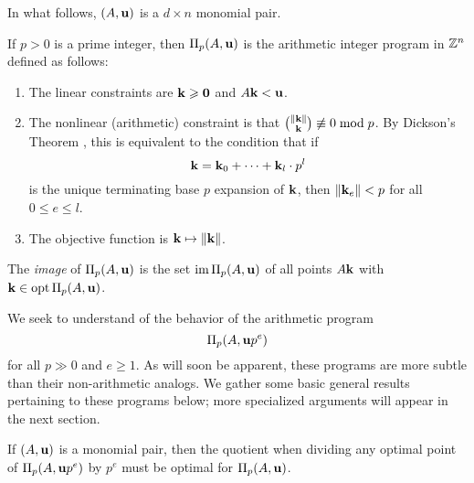 \documentclass[11pt]{amsart}
\begin{document}
In what follows, $(A, \mathbf{u})$ is a $d \times n$ monomial pair.


\begin{definition} If $p>0$ is a prime integer, then $\Pi_p(A, \mathbf{u})$ is the arithmetic integer program in $\mathbb{Z}^n$ defined as follows:
\begin{enumerate}
\item The linear constraints are $\mathbf{k} \geqslant \mathbf{0}$ and $A \mathbf{k} < \mathbf{u}$.  
\item The nonlinear (arithmetic) constraint is that $\binom{\| \mathbf{k} \|}{\mathbf{k}} \not \equiv 0 \bmod p$.
By Dickson's Theorem \cite{dickson.multinomial}, this is equivalent to the condition that  if \[ \mathbf{k} = \mathbf{k}_0 + \cdots + \mathbf{k}_l \cdot  p^l\] is the unique terminating base $p$ expansion of $\mathbf{k}$, then $\| \mathbf{k}_e \| < p$ for all $0 \leq e \leq l $.
\item The objective function is $\mathbf{k} \mapsto \| \mathbf{k} \|$.
\end{enumerate}

\end{definition}



\begin{definition}
The \emph{image} of $\Pi_p(A, \mathbf{u})$ is the set $\operatorname{im} \Pi_p(A, \mathbf{u})$ of all points  $A \mathbf{k}$ with $\mathbf{k} \in \operatorname{opt} \Pi_p(A, \mathbf{u})$. 
\end{definition}

We seek to understand of the behavior of the arithmetic program \[ \Pi_p(A, \mathbf{u}p^e)\] for all $p \gg 0$ and $e \geq 1$.    As will soon be apparent, these programs are more subtle than their non-arithmetic analogs.  We gather some basic general results pertaining to these programs below;  more specialized arguments will appear in the next section.

\begin{lemma} 
\label{optimal division: L}  If $(A, \mathbf{u})$ is a monomial pair, then the quotient when dividing any optimal point of $\Pi_p(A, \mathbf{u}p^e)$ by $p^e$ must be optimal for $\Pi_p(A, \mathbf{u})$.
\end{lemma}
\end{document}
